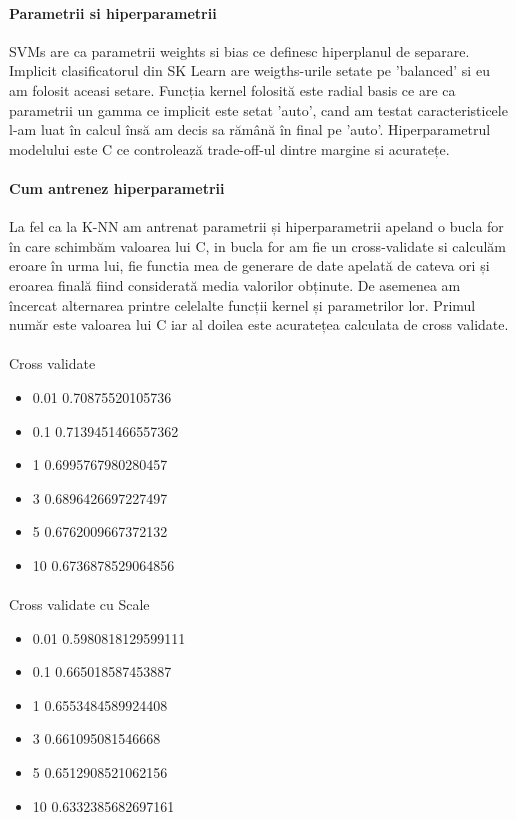 \documentclass{article}
\begin{document}
 
\paragraph{Parametrii si hiperparametrii} SVMs are ca parametrii weights si bias ce definesc hiperplanul de separare. Implicit clasificatorul din SK Learn are weigths-urile setate pe 'balanced' si eu am folosit aceasi setare. Funcția kernel folosită este radial basis ce are ca parametrii un gamma ce implicit este setat 'auto', cand am testat caracteristicele l-am luat în calcul însă am decis sa rămână în final pe 'auto'. Hiperparametrul modelului este C ce controlează trade-off-ul dintre margine si acuratețe.
\paragraph{Cum antrenez hiperparametrii} La fel ca la K-NN am antrenat parametrii și hiperparametrii apeland o bucla for în care schimbăm valoarea lui C, in bucla for am fie un cross-validate si calculăm eroare în urma lui, fie functia mea de generare de date apelată de cateva ori și eroarea finală fiind considerată media valorilor obținute. De asemenea am încercat alternarea printre celelalte funcții kernel și parametrilor lor. Primul număr este valoarea lui C iar al doilea este acuratețea calculata de cross validate.
 
\paragraph{} Cross validate
\begin{itemize}
  \item 0.01 0.70875520105736
  \item 0.1 0.7139451466557362
  \item 1 0.6995767980280457
  \item 3 0.6896426697227497
  \item 5 0.6762009667372132
  \item 10 0.6736878529064856
\end{itemize}
 
\paragraph{} Cross validate cu Scale
\begin{itemize}
  \item 0.01 0.5980818129599111
  \item 0.1 0.665018587453887
  \item 1 0.6553484589924408
  \item 3 0.661095081546668
  \item 5 0.6512908521062156
  \item 10 0.6332385682697161
\end{itemize}
 
\end{document}

